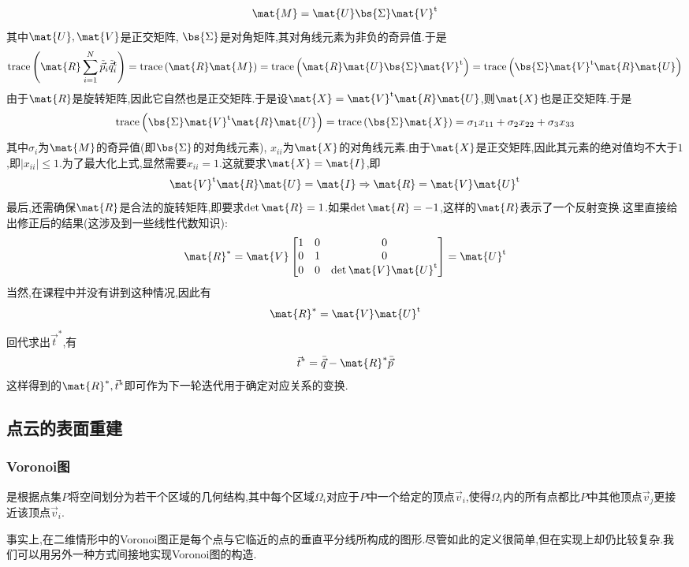 \documentclass{ctexart}
\begin{document}
\[\mat{M}=\mat{U}\bs{\Sigma}\mat{V}^{\text{t}}\]
其中$\mat{U},\mat{V}$是正交矩阵, $\bs{\Sigma}$是对角矩阵,其对角线元素为非负的奇异值.于是
\[\text{trace}\left(\mat{R}\sum_{i=1}^{N}\tilde{\vec{p}}_i\tilde{\vec{q}}_i^{\text{t}}\right)=\text{trace}\left(\mat{R}\mat{M}\right)=\text{trace}\left(\mat{R}\mat{U}\bs{\Sigma}\mat{V}^{\text{t}}\right)=\text{trace}\left(\bs{\Sigma}\mat{V}^{\text{t}}\mat{R}\mat{U}\right)\]
由于$\mat{R}$是旋转矩阵,因此它自然也是正交矩阵.于是设$\mat{X}=\mat{V}^{\text{t}}\mat{R}\mat{U}$,则$\mat{X}$也是正交矩阵.于是
\[\text{trace}\left(\bs{\Sigma}\mat{V}^{\text{t}}\mat{R}\mat{U}\right)=\text{trace}\left(\bs{\Sigma}\mat{X}\right)=\sigma_1x_{11}+\sigma_2x_{22}+\sigma_3x_{33}\]
其中$\sigma_i$为$\mat{M}$的奇异值(即$\bs{\Sigma}$的对角线元素), $x_{ii}$为$\mat{X}$的对角线元素.由于$\mat{X}$是正交矩阵,因此其元素的绝对值均不大于$1$,即$|x_{ii}|\leq 1$.为了最大化上式,显然需要$x_{ii}=1$.这就要求$\mat{X}=\mat{I}$,即
\[\mat{V}^{\text{t}}\mat{R}\mat{U}=\mat{I}\Rightarrow \mat{R}=\mat{V}\mat{U}^{\text{t}}\]
最后,还需确保$\mat{R}$是合法的旋转矩阵,即要求$\det\mat{R}=1$.如果$\det\mat{R}=-1$,这样的$\mat{R}$表示了一个反射变换.这里直接给出修正后的结果(这涉及到一些线性代数知识):
\[\mat{R}^\ast=\mat{V}\begin{bmatrix}
    1&0&0\\0&1&0\\0&0&\det\mat{V}\mat{U}^{\text{t}}
\end{bmatrix}=\mat{U}^{\text{t}}\]
当然,在课程中并没有讲到这种情况,因此有
\[\mat{R}^\ast=\mat{V}\mat{U}^{\text{t}}\]
回代求出$\vec{t}^\ast$,有
\[\vec{t}^\ast=\bar{\vec{q}}-\mat{R}^\ast\bar{\vec{p}}\]
这样得到的$\mat{R}^\ast,\vec{t}^\ast$即可作为下一轮迭代用于确定对应关系的变换.
\subsection{点云的表面重建}
\subsubsection{Voronoi图}
\begin{definition}[Voronoi图]
    是根据点集$P$将空间划分为若干个区域的几何结构,其中每个区域$\Omega_i$对应于$P$中一个给定的顶点$\vec{v}_i$,使得$\Omega_i$内的所有点都比$P$中其他顶点$\vec{v}_j$更接近该顶点$\vec{v}_i$.
\end{definition}
事实上,在二维情形中的Voronoi图正是每个点与它临近的点的垂直平分线所构成的图形.尽管如此的定义很简单,但在实现上却仍比较复杂.我们可以用另外一种方式间接地实现Voronoi图的构造.
\end{document}

